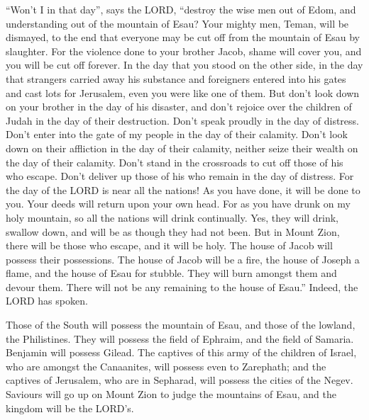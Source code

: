  ``Won't I in that day'', says the LORD, ``destroy the
wise men out of Edom, and understanding out of the mountain of Esau?
 Your mighty men, Teman, will be dismayed, to the end that
everyone may be cut off from the mountain of Esau by slaughter.
 For the violence done to your brother Jacob, shame will
cover you, and you will be cut off forever.  In the day
that you stood on the other side, in the day that strangers carried away
his substance and foreigners entered into his gates and cast lots for
Jerusalem, even you were like one of them.  But don't
look down on your brother in the day of his disaster, and don't rejoice
over the children of Judah in the day of their destruction. Don't speak
proudly in the day of distress.  Don't enter into the
gate of my people in the day of their calamity. Don't look down on their
affliction in the day of their calamity, neither seize their wealth on
the day of their calamity.  Don't stand in the crossroads
to cut off those of his who escape. Don't deliver up those of his who
remain in the day of distress.  For the day of the LORD
is near all the nations! As you have done, it will be done to you. Your
deeds will return upon your own head.  For as you have
drunk on my holy mountain, so all the nations will drink continually.
Yes, they will drink, swallow down, and will be as though they had not
been.  But in Mount Zion, there will be those who escape,
and it will be holy. The house of Jacob will possess their possessions.
 The house of Jacob will be a fire, the house of Joseph a
flame, and the house of Esau for stubble. They will burn amongst them
and devour them. There will not be any remaining to the house of Esau.''
Indeed, the LORD has spoken.

 Those of the South will possess the mountain of Esau,
and those of the lowland, the Philistines. They will possess the field
of Ephraim, and the field of Samaria. Benjamin will possess Gilead.
 The captives of this army of the children of Israel, who
are amongst the Canaanites, will possess even to Zarephath; and the
captives of Jerusalem, who are in Sepharad, will possess the cities of
the Negev.  Saviours will go up on Mount Zion to judge
the mountains of Esau, and the kingdom will be the LORD's.

